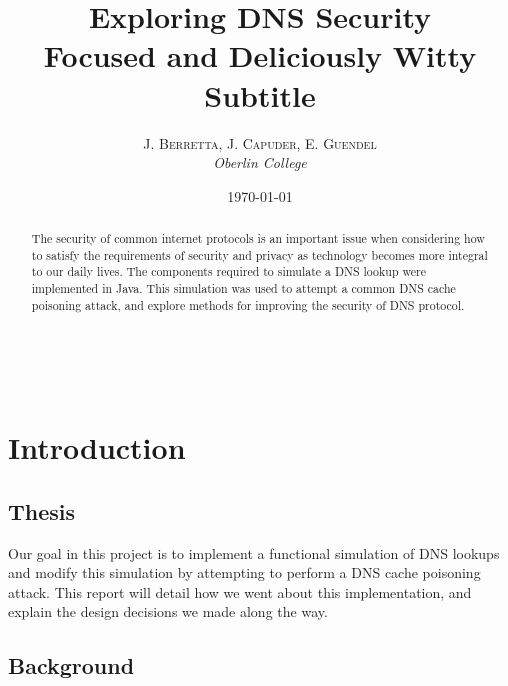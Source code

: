 \documentclass[a4paper, 12pt]{article} %
\title{\textbf{Exploring DNS Security}\\ %
Focused and Deliciously Witty Subtitle} %
\author{\textsc{J. Berretta, J. Capuder, E. Guendel} %
\\{\textit{Oberlin College}}} %
\date{\today} %
\makeatletter
\renewcommand{\maketitle}{ %
\begin{flushright} %
{\LARGE\@title} %

\vspace{30pt} %

{\large\@author} %
\\\@date %

\vspace{30pt} %
\end{flushright}
}
\makeatother
\begin{document}
\maketitle %



\begin{abstract}
The security of common internet protocols is an important issue when considering how to satisfy the requirements of security and privacy as technology becomes more integral to our daily lives. The components required to simulate a DNS lookup were implemented in Java. This simulation was used to attempt a common DNS cache poisoning attack, and explore methods for improving the security of DNS protocol.
\end{abstract}


\vspace{10pt} %


\section*{Introduction}

\subsection*{Thesis}

Our goal in this project is to implement a functional simulation of DNS lookups and modify this simulation by attempting to perform a DNS cache poisoning attack. This report will detail how we went about this implementation, and explain the design decisions we made along the way.

\subsection*{Background}
\end{document}
